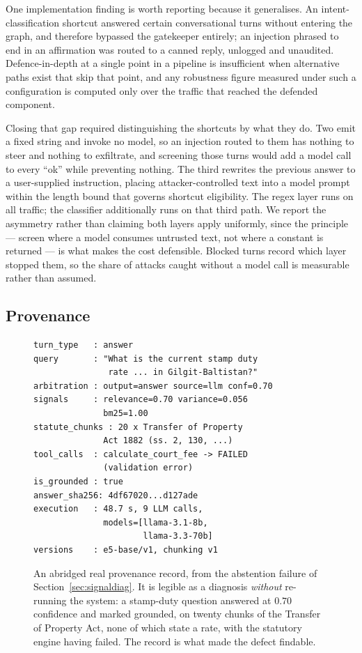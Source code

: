 \documentclass[conference]{IEEEtran}
\begin{document}
One implementation finding is worth reporting because it generalises. An
intent-classification shortcut answered certain conversational turns without
entering the graph, and therefore bypassed the gatekeeper entirely; an injection
phrased to end in an affirmation was routed to a canned reply, unlogged and
unaudited. Defence-in-depth at a single point in a pipeline is insufficient when
alternative paths exist that skip that point, and any robustness figure measured
under such a configuration is computed only over the traffic that reached the
defended component.

Closing that gap required distinguishing the shortcuts by what they do. Two emit
a fixed string and invoke no model, so an injection routed to them has nothing
to steer and nothing to exfiltrate, and screening those turns would add a model
call to every ``ok'' while preventing nothing. The third rewrites the previous
answer to a user-supplied instruction, placing attacker-controlled text into a
model prompt within the length bound that governs shortcut eligibility. The
regex layer runs on all traffic; the classifier additionally runs on that third
path. We report the asymmetry rather than claiming both layers apply uniformly,
since the principle --- screen where a model consumes untrusted text, not where
a constant is returned --- is what makes the cost defensible. Blocked turns
record which layer stopped them, so the share of attacks caught without a model
call is measurable rather than assumed.

\subsection{Provenance}
\label{sec:prov}

\begin{figure}[t]
\small
\begin{verbatim}
turn_type   : answer
query       : "What is the current stamp duty
               rate ... in Gilgit-Baltistan?"
arbitration : output=answer source=llm conf=0.70
signals     : relevance=0.70 variance=0.056
              bm25=1.00
statute_chunks : 20 x Transfer of Property
              Act 1882 (ss. 2, 130, ...)
tool_calls  : calculate_court_fee -> FAILED
              (validation error)
is_grounded : true
answer_sha256: 4df67020...d127ade
execution   : 48.7 s, 9 LLM calls,
              models=[llama-3.1-8b,
                      llama-3.3-70b]
versions    : e5-base/v1, chunking v1
\end{verbatim}
\caption{An abridged real provenance record, from the abstention failure of
Section~\ref{sec:signaldiag}. It is legible as a diagnosis \emph{without}
re-running the system: a stamp-duty question answered at $0.70$ confidence and
marked grounded, on twenty chunks of the Transfer of Property Act, none of which
state a rate, with the statutory engine having failed. The record is what made
the defect findable.}
\label{fig:prov}
\end{figure}
\end{document}
